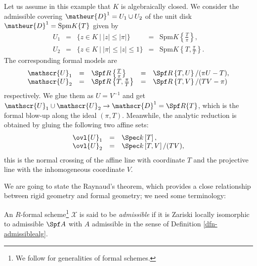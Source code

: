 \vspace{1ex}

\begin{appexa}
Let us assume in this example that $K$ is algebraically closed.
We consider the admissible covering $\matheur{D}^1=U_1\cup U_2$ of the
unit disk $\matheur{D}^1=\mathrm{Spm}K\{T\}$ given by
\begin{equation*}
 \begin{array}{cclcl}
 U_1&=&\{z\in K\ |\ |z|\leq|\pi|\}&=&\mathrm{Spm}K\left\{\frac{T}{\pi}
 \right\},\\
 U_2&=&\{z\in K\ |\ |\pi|\leq |z|\leq 1\}&=&
 \mathrm{Spm}K\left\{T,\frac{\pi}{T}\right\}.
 \end{array}
\end{equation*}
The corresponding formal models are
\begin{equation*}
 \begin{array}{cclcl}
 \mathscr{U}_1&=&\Spf R\left\{\frac{T}{\pi}\right\}
 &=&\Spf R\left\{T,U\right\}/(\pi U-T),\\
 \mathscr{U}_2&=&\Spf R\left\{T,\frac{\pi}{T}\right\}
 &=&\Spf R\left\{T,V\right\}/(TV-\pi)
 \end{array}
\end{equation*}
respectively. We glue them as $U=V^{-1}$ and get 
$\mathscr{U}_1\cup\mathscr{U}_2\rightarrow\mathscr{D}^1=\Spf R\{T\}$,
which is the formal blow-up along the ideal $(\pi,T)$.
Meanwhile, the analytic reduction is obtained by gluing the following 
two affine sets:
\begin{equation*}
 \begin{array}{ccl}
 \ovl{U}_1&=&\Spec k\left[T\right],\\
 \ovl{U}_2&=&\Spec k\left[T,V\right]/(TV),
 \end{array}
\end{equation*}
this is the normal crossing of the affine line with coordinate $T$ and 
the projective line with the inhomogeneous coordinate $V$.
\end{appexa}

We are going to state the Raynaud's theorem, which provides a close
relationship between rigid geometry and formal geometry; we need some
terminology:

\begin{appdfn}
An $R$-formal scheme\footnote{We follow 
\cite[\S 10]{ega1} for generalities of formal schemes.}
$\mathscr{X}$ is said to
be {\it admissible} if it is Zariski locally isomorphic to admissible
$\Spf A$ with $A$ admissible in the sense of Definition 
\ref{dfn-admissiblealg}.
\end{appdfn}

